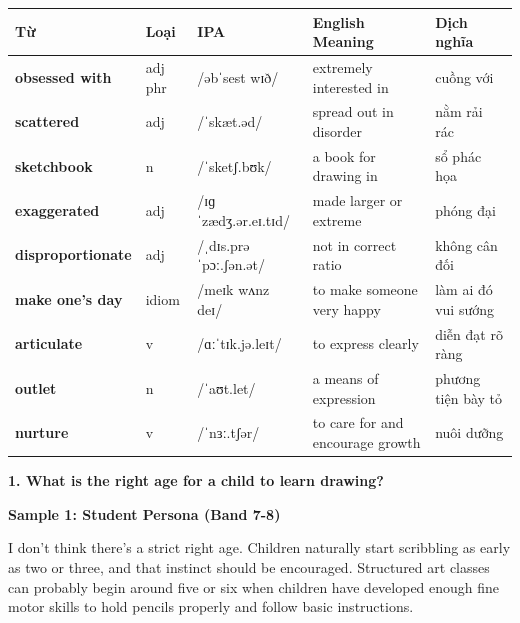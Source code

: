 \vspace{0.8em}
\begin{center}
\renewcommand{\arraystretch}{1.65}
\begin{tabularx}{\textwidth}{|V{0.22\textwidth}|C{0.07\textwidth}|I{0.20\textwidth}|Y|V{0.18\textwidth}|}
\hline
{}
\textbf{Từ} & \textbf{Loại} & \textbf{IPA} & \textbf{English Meaning} & \textbf{Dịch nghĩa} \\
\hline
\textbf{obsessed with} & adj phr & /əbˈsest wɪð/ & extremely interested in & cuồng với \\ \hline
\textbf{scattered} & adj & /ˈskæt.əd/ & spread out in disorder & nằm rải rác \\ \hline
\textbf{sketchbook} & n & /ˈsketʃ.bʊk/ & a book for drawing in & sổ phác họa \\ \hline
\textbf{exaggerated} & adj & /ɪɡˈzædʒ.ər.eɪ.tɪd/ & made larger or extreme & phóng đại \\ \hline
\textbf{disproportionate} & adj & /ˌdɪs.prəˈpɔː.ʃən.ət/ & not in correct ratio & không cân đối \\ \hline
\textbf{make one's day} & idiom & /meɪk wʌnz deɪ/ & to make someone very happy & làm ai đó vui sướng \\ \hline
\textbf{articulate} & v & /ɑːˈtɪk.jə.leɪt/ & to express clearly & diễn đạt rõ ràng \\ \hline
\textbf{outlet} & n & /ˈaʊt.let/ & a means of expression & phương tiện bày tỏ \\ \hline
\textbf{nurture} & v & /ˈnɜː.tʃər/ & to care for and encourage growth & nuôi dưỡng \\ \hline
\end{tabularx}
\end{center}

\partthreeheader

\begin{ieltsquestion}
\textbf{1. What is the right age for a child to learn drawing?}
\end{ieltsquestion}
\textbf{Sample 1: Student Persona (Band 7-8)}

I don't think there's a strict right age. Children naturally start scribbling as early as two or three, and that instinct should be encouraged. Structured art classes can probably begin around five or six when children have developed enough fine motor skills to hold pencils properly and follow basic instructions.

\separator


